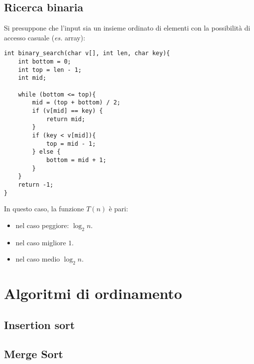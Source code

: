 \subsection{Ricerca binaria}
Si presuppone che l'input sia un insieme ordinato di elementi con la possibilità di accesso casuale (\textit{es.} array):
\begin{lstlisting}[title={Ricerca binaria}]
int binary_search(char v[], int len, char key){
    int bottom = 0;
    int top = len - 1;
    int mid;

    while (bottom <= top){
        mid = (top + bottom) / 2;
        if (v[mid] == key) {
            return mid;
        }
        if (key < v[mid]){
            top = mid - 1;
        } else {
            bottom = mid + 1;
        }
    }
    return -1;
}
\end{lstlisting}
In questo caso, la funzione $T(n)$ è pari:
\begin{itemize}[noitemsep, nolistsep]
	\item nel caso peggiore: $\log_2n$.
	\item nel caso migliore $1$.
	\item nel caso medio $\log_2n$.
\end{itemize}

\section{Algoritmi di ordinamento}

\subsection{Insertion sort}

\subsection{Merge Sort}